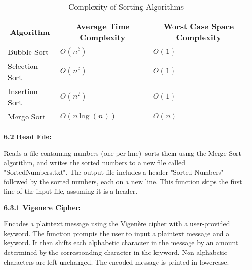 \begin{homeworkProblem}
	\begin{table}[ht]
		\caption{Complexity of Sorting Algorithms}\label{tab:sort_complexity}
		\begin{center}
			\begin{tabular}[c]{l|l|l}
				\hline
				\multicolumn{1}{c|}{\textbf{Algorithm}} &
				\multicolumn{1}{c|}{\textbf{Average Time Complexity}} &
				\multicolumn{1}{c}{\textbf{Worst Case Space Complexity}} \\
				\hline
				Bubble Sort & \( O \left( n^2 \right) \) & \( O \left( 1 \right) \) \\
				Selection Sort &  \( O \left( n^2 \right) \) & \( O \left( 1 \right) \) \\
				Insertion Sort & \( O \left( n^2 \right) \) & \( O \left( 1 \right) \) \\
				Merge Sort & \( O \left( n \log \left( n \right) \right) \) & \( O \left( n \right) \)
			\end{tabular}
		\end{center}
	\end{table}
	
\end{homeworkProblem}

\begin{homeworkProblem}

	{\Large\textbf{6.2 Read File:}}

	Reads a file containing numbers (one per line), sorts them using the Merge Sort algorithm, and writes the sorted numbers to a new file called "SortedNumbers.txt". The output file includes a header "Sorted Numbers" followed by the sorted numbers, each on a new line. This function skips the first line of the input file, assuming it is a header.

\end{homeworkProblem}

\begin{homeworkProblem}

	{\Large\textbf{6.3.1 Vigenere Cipher:}}

	Encodes a plaintext message using the Vigenère cipher with a user-provided keyword. The function prompts the user to input a plaintext message and a keyword. It then shifts each alphabetic character in the message by an amount determined by the corresponding character in the keyword. Non-alphabetic characters are left unchanged. The encoded message is printed in lowercase.

\end{homeworkProblem}

